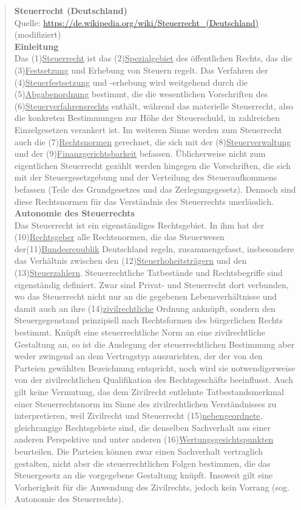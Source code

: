 \documentclass[12pt,a4paper,twoside]{article}
\begin{document}
\begin{quote}
  \textbf{Steuerrecht (Deutschland)}\\
  {\footnotesize Quelle: \url{https://de.wikipedia.org/wiki/Steuerrecht_(Deutschland)} (modifiziert)}\\

  \textbf{Einleitung}\\
  Das (1)\ul{Steuerrecht} ist das (2)\ul{Spezialgebiet} des öffentlichen Rechts, das die (3)\ul{Festsetzung} und Erhebung von Steuern regelt. Das Verfahren der (4)\ul{Steuerfestsetzung} und -erhebung wird weitgehend durch die (5)\ul{Abgabenordnung} bestimmt, die die wesentlichen Vorschriften des (6)\ul{Steuerverfahrensrechts} enthält, während das materielle Steuerrecht, also die konkreten Bestimmungen zur Höhe der Steuerschuld, in zahlreichen Einzelgesetzen verankert ist. Im weiteren Sinne werden zum Steuerrecht auch die (7)\ul{Rechtsnormen} gerechnet, die sich mit der (8)\ul{Steuerverwaltung} und der (9)\ul{Finanzgerichtsbarkeit} befassen. Üblicherweise nicht zum eigentlichen Steuerrecht gezählt werden hingegen die Vorschriften, die sich mit der Steuergesetzgebung und der Verteilung des Steueraufkommens befassen (Teile des Grundgesetzes und das Zerlegungsgesetz). Dennoch sind diese Rechtsnormen für das Verständnis des Steuerrechts unerlässlich.\\

  \textbf{Autonomie des Steuerrechts}\\
  Das Steuerrecht ist ein eigenständiges Rechtsgebiet. In ihm hat der (10)\ul{Rechtsgeber} alle Rechtsnormen, die das Steuerwesen der(11)\ul{Bundesrepublik} Deutschland regeln, zusammengefasst, insbesondere das Verhältnis zwischen den (12)\ul{Steuerhoheitsträgern} und den (13)\ul{Steuerzahlern}. Steuerrechtliche Tatbestände und Rechtsbegriffe sind eigenständig definiert. Zwar sind Privat- und Steuerrecht dort verbunden, wo das Steuerrecht nicht nur an die gegebenen Lebensverhältnisse und damit auch an ihre (14)\ul{zivilrechtliche} Ordnung anknüpft, sondern den Steuergegenstand prinzipiell nach Rechtsformen des bürgerlichen Rechts bestimmt. Knüpft eine steuerrechtliche Norm an eine zivilrechtliche Gestaltung an, so ist die Auslegung der steuerrechtlichen Bestimmung aber weder zwingend an dem Vertragstyp auszurichten, der der von den Parteien gewählten Bezeichnung entspricht, noch wird sie notwendigerweise von der zivilrechtlichen Qualifikation des Rechtsgeschäfts beeinflusst. Auch gilt keine Vermutung, das dem Zivilrecht entlehnte Tatbestandsmerkmal einer Steuerrechtsnorm im Sinne des zivilrechtlichen Verständnisses zu interpretieren, weil Zivilrecht und Steuerrecht (15)\ul{nebengeordnete}, gleichrangige Rechtsgebiete sind, die denselben Sachverhalt aus einer anderen Perspektive und unter anderen (16)\ul{Wertungsgesichtspunkten} beurteilen. Die Parteien können zwar einen Sachverhalt vertraglich gestalten, nicht aber die steuerrechtlichen Folgen bestimmen, die das Steuergesetz an die vorgegebene Gestaltung knüpft. Insoweit gilt eine Vorherigkeit für die Anwendung des Zivilrechts, jedoch kein Vorrang (sog. Autonomie des Steuerrechts).
\end{quote}
\end{document}
